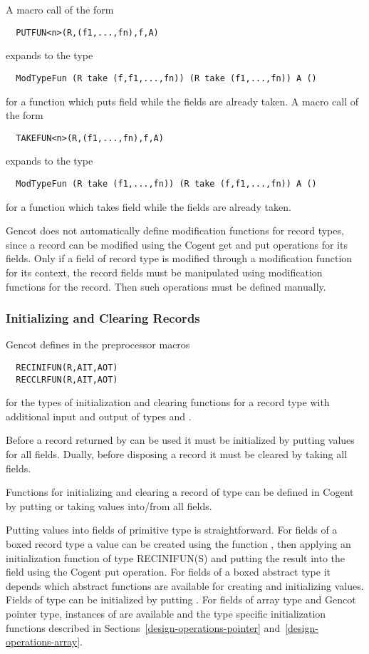 A macro call of the form 
\begin{verbatim}
  PUTFUN<n>(R,(f1,...,fn),f,A)
\end{verbatim}
expands to the type
\begin{verbatim}
  ModTypeFun (R take (f,f1,...,fn)) (R take (f1,...,fn)) A ()
\end{verbatim}
for a function which puts field  while the fields  are already taken. A macro call of the form
\begin{verbatim}
  TAKEFUN<n>(R,(f1,...,fn),f,A)
\end{verbatim}
expands to the type
\begin{verbatim}
  ModTypeFun (R take (f1,...,fn)) (R take (f,f1,...,fn)) A ()
\end{verbatim}
for a function which takes field  while the fields  are already taken.

Gencot does not automatically define modification functions for record types, since a record can be modified using the
Cogent get and put operations for its fields. Only if a field of record type is modified through a modification function for its context, the record fields
must be manipulated using modification functions for the record. Then such operations must be defined manually.

\subsubsection{Initializing and Clearing Records}

Gencot defines in  the preprocessor macros
\begin{verbatim}
  RECINIFUN(R,AIT,AOT)
  RECCLRFUN(R,AIT,AOT)
\end{verbatim}
for the types of initialization and clearing functions for a record type  with additional input and output of types
 and .

Before a record returned by  can be used it must be initialized by putting values for all fields. 
Dually, before disposing a record it must be cleared by taking all fields.

Functions
for initializing and clearing a record  of type  can be defined in Cogent by putting or taking values 
into/from all fields.

Putting values into fields of primitive type is straightforward. For fields of a boxed record type  a value can be created 
using the function , then applying an initialization function of type RECINIFUN(S) and putting the result into the field using the
Cogent put operation. For fields of a boxed abstract type it depends which abstract functions are available for creating and 
initializing values. Fields of type  can be initialized by putting . For fields of array type and Gencot
pointer type, instances of  are available and the type specific initialization functions described in 
Sections~\ref{design-operations-pointer} and~\ref{design-operations-array}.

